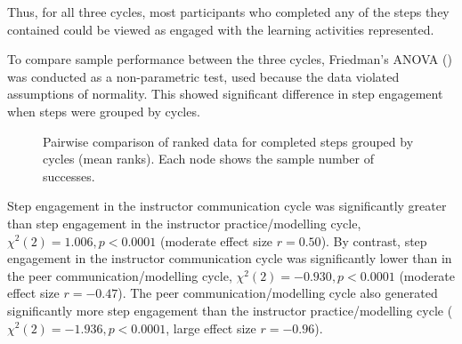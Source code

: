 \documentclass[output=paper]{langscibook}
\begin{document}
Thus, for all three cycles, most participants who completed any of the steps they contained could be viewed as engaged with the learning activities represented. 

\begin{sloppypar}
To compare sample performance between the three cycles, Friedman’s ANOVA () was conducted as a non-parametric test, used because the data violated assumptions of normality. This showed significant difference in step engagement when steps were grouped by cycles.
\end{sloppypar}

\begin{figure}
\caption{\label{fig:porter:2}Pairwise comparison of ranked data for completed steps grouped by cycles (mean ranks). Each node shows the sample number of successes.}
\end{figure}

\begin{sloppypar}
Step engagement in the instructor communication cycle was significantly greater than step engagement in the instructor practice/modelling cycle, $\chi^2(2) = 1.006,\allowbreak p <0.0001$ (moderate effect size $ r= 0.50$). By contrast, step engagement in the instructor communication cycle was significantly lower than in the peer communication\slash modelling cycle, $\chi^2(2) = -0.930,\allowbreak p <0.0001$ (moderate effect size $r=-0.47$). The peer communication\slash modelling cycle also generated significantly more step engagement than the instructor practice\slash modelling cycle ($\chi^2(2) = -1.936,\allowbreak p <0.0001$, large effect size $r =-0.96$).
\end{sloppypar}
\end{document}
